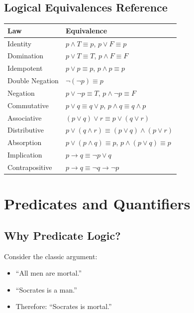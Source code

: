 \documentclass[11pt,a4paper]{article}
\begin{document}
\subsection{Logical Equivalences Reference}

\begin{center}
\renewcommand{\arraystretch}{1.3}
\begin{tabular}{l|l}
\toprule
\textbf{Law} & \textbf{Equivalence} \\
\midrule
Identity & $p \land T \equiv p$, \quad $p \lor F \equiv p$ \\
Domination & $p \lor T \equiv T$, \quad $p \land F \equiv F$ \\
Idempotent & $p \lor p \equiv p$, \quad $p \land p \equiv p$ \\
Double Negation & $\neg(\neg p) \equiv p$ \\
Negation & $p \lor \neg p \equiv T$, \quad $p \land \neg p \equiv F$ \\
Commutative & $p \lor q \equiv q \lor p$, \quad $p \land q \equiv q \land p$ \\
Associative & $(p \lor q) \lor r \equiv p \lor (q \lor r)$ \\
Distributive & $p \lor (q \land r) \equiv (p \lor q) \land (p \lor r)$ \\
Absorption & $p \lor (p \land q) \equiv p$, \quad $p \land (p \lor q) \equiv p$ \\
Implication & $p \to q \equiv \neg p \lor q$ \\
Contrapositive & $p \to q \equiv \neg q \to \neg p$ \\
\bottomrule
\end{tabular}
\end{center}

\newpage


\section{Predicates and Quantifiers}

\subsection{Why Predicate Logic?}

Consider the classic argument:
\begin{itemize}[noitemsep]
    \item ``All men are mortal.''
    \item ``Socrates is a man.''
    \item Therefore: ``Socrates is mortal.''
\end{itemize}
\end{document}

